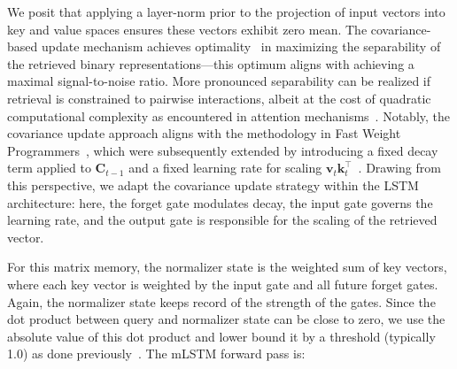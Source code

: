 We posit that applying a layer-norm prior to the projection of input vectors into key and value spaces ensures these vectors exhibit zero mean. The covariance-based update mechanism achieves optimality~\citep{Dayan:91} in maximizing the separability of the retrieved binary representations—this optimum aligns with achieving a maximal signal-to-noise ratio. More pronounced separability can be realized if retrieval is constrained to pairwise interactions, albeit at the cost of quadratic computational complexity as encountered in attention mechanisms~\citep{Krotov:16,Krotov:17,Ramsauer:21}. Notably, the covariance update approach aligns with the methodology in Fast Weight Programmers~\citep{Schmidhuber:92ncfastweights,Schlag:21}, which were subsequently extended by introducing a fixed decay term applied to $\mathbf{C}_{t-1}$ and a fixed learning rate for scaling 
$\mathbf{v}_{t} \mathbf{k}_t ^\top$~\citep{Ba:16}. Drawing from this perspective, we adapt the covariance update strategy within the LSTM architecture: here, the forget gate modulates decay, the input gate governs the learning rate, and the output gate is responsible for the scaling of the retrieved vector.

For this matrix memory, the normalizer state is the weighted sum of key vectors, where each key vector is weighted by the input gate and all future forget gates. Again, the normalizer state keeps record of the strength of the gates. Since the dot product between query and normalizer state can be close to zero, we use the absolute value of this dot product and lower bound it by a threshold (typically 1.0) as done previously~\citep{Sun:23arxiv}. The mLSTM forward pass is:

